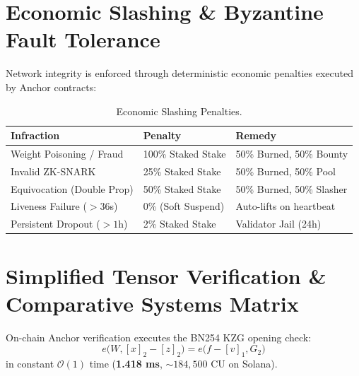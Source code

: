 \documentclass[10pt,twocolumn,letterpaper]{article}
\begin{document}
\section{Economic Slashing \& Byzantine Fault Tolerance}
Network integrity is enforced through deterministic economic penalties executed by Anchor contracts:

\begin{table}[htbp]
\centering
\small
\caption{Economic Slashing Penalties.}
\label{tab:slashing}
\begin{tabularx}{\columnwidth}{lXX}
\toprule
\textbf{Infraction} & \textbf{Penalty} & \textbf{Remedy} \\
\midrule
Weight Poisoning / Fraud & 100\% Staked Stake & 50\% Burned, 50\% Bounty \\
Invalid ZK-SNARK & 25\% Staked Stake & 50\% Burned, 50\% Pool \\
Equivocation (Double Prop) & 50\% Staked Stake & 50\% Burned, 50\% Slasher \\
Liveness Failure ($>36$s) & 0\% (Soft Suspend) & Auto-lifts on heartbeat \\
Persistent Dropout ($>1$h) & 2\% Staked Stake & Validator Jail (24h) \\
\bottomrule
\end{tabularx}
\end{table}

\section{Simplified Tensor Verification \& Comparative Systems Matrix}
On-chain Anchor verification executes the BN254 KZG opening check:
\begin{equation}
e\Big(W, [x]_2 - [z]_2\Big) = e\Big(f - [v]_1, G_2\Big)
\end{equation}
in constant $\mathcal{O}(1)$ time (\textbf{1.418 ms}, $\sim 184,500$ CU on Solana).
\end{document}
